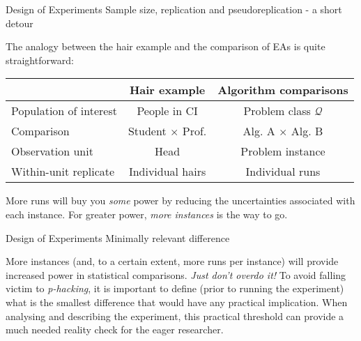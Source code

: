 \documentclass[t]{beamer}
\begin{document}
\begin{ftst}
{Design of Experiments}
{Sample size, replication and pseudoreplication - a short detour}
The analogy between the hair example and the comparison of EAs is quite straightforward:
\begin{block}{}
\begin{center}
\begin{tabular}{l|c|c}
\footnotesize
                                    & \textbf{Hair example}        & \textbf{Algorithm comparisons} \\ 
\hline
Population of interest    & People in CI                       & Problem class $\mathcal{Q}$\\
Comparison                  & Student $\times$ Prof.       & Alg. A $\times$ Alg. B\\ 
Observation unit           & Head                                & Problem instance\\ 
Within-unit replicate     & Individual hairs                  & Individual runs\\
\end{tabular} 
\end{center}
\end{block}
\vhalf
More runs will buy you \textit{some} power by reducing the uncertainties associated with each instance. 
\vhalf
For greater power, \textit{more instances} is the way to go.
\end{ftst}


\begin{ftst}
{Design of Experiments}
{Minimally relevant difference}
More instances (and, to a certain extent, more runs per instance) will provide increased power in statistical comparisons. 
\vone
\textit{Just don't overdo it!}
\vone
To avoid falling victim to \textit{p-hacking}, it is important to define (prior to running the experiment) what is the smallest difference that would have any practical implication.
\vone
When analysing and describing the experiment, this practical threshold can provide a much needed reality check for the eager researcher.
\end{ftst}
\end{document}
